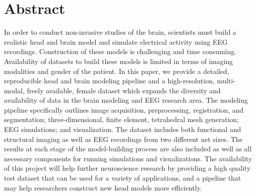 %

\section*{Abstract}

In order to conduct non-invasive studies of the brain, scientists must build a realistic head and brain model and simulate electrical activity using EEG recordings. Construction of these models is challenging and time consuming. Availability of datasets to build these models is limited in terms of imaging modalities and gender of the patient. In this paper, we provide a detailed, reproducible head and brain modeling pipeline and a high-resolution, multi-modal, freely available, female dataset which expands the diversity and availability of data in the brain modeling and EEG research area. The modeling pipeline specifically outlines image acquisition, preprocessing, registration, and segmentation; three-dimensional, finite element, tetrahedral mesh generation; EEG simulations; and visualization. The dataset includes both functional and structural imaging as well as EEG recordings from two different net sizes. The results at each stage of the model-building process are also included as well as all necessary components for running simulations and visualizations. The availability of this project will help further neuroscience research by providing a high quality test dataset that can be used for a variety of applications, and a pipeline that may help researchers construct new head models more efficiently.
